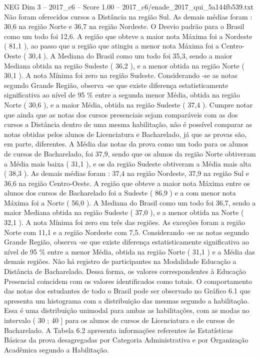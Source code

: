 \begin{textsample}{NEG Dim 3 – 2017\_c6 – Score 1.00 – 2017\_c6/enade\_2017\_qui\_5a144fb539.txt}
Não foram oferecidos cursos a Distância na região Sul.
As demais médias foram : 30,6 na região Norte e 36,7 na região Nordeste.
O Desvio padrão para o Brasil como um todo foi 12,6.
A região que obteve a maior nota Máxima foi a Nordeste ( 81,1 ), ao passo que a região que atingiu a menor nota Máxima foi a Centro-Oeste ( 30,4 ).
A Mediana do Brasil como um todo foi 35,3, sendo a maior Mediana obtida na região Sudeste ( 36,2 ), e a menor obtida na região Norte ( 30,1 ).
A nota Mínima foi zero na região Sudeste.
Considerando -se as notas segundo Grande Região, observa -se que existe diferença estatisticamente significativa ao nível de 95 \% entre a segunda menor Média, obtida na região Norte ( 30,6 ), e a maior Média, obtida na região Sudeste ( 37,4 ).
Cumpre notar que ainda que as notas dos cursos presenciais sejam comparáveis com as dos cursos a Distância dentro de uma mesma habilitação, não é possível comparar as notas obtidas pelos alunos de Licenciatura e Bacharelado, já que as provas são, em parte, diferentes.
A Média das notas da prova como um todo para os alunos de cursos de Bacharelado, foi 37,9, sendo que os alunos da região Norte obtiveram a Média mais baixa ( 31,1 ), e os da região Sudeste obtiveram a Média mais alta ( 38,3 ).
As demais médias foram : 37,4 na região Nordeste, 37,9 na região Sul e 36,6 na região Centro-Oeste.
A região que obteve a maior nota Máxima entre os alunos dos cursos de Bacharelado foi a Sudeste ( 86,9 ) e a com menor nota Máxima foi a Norte ( 56,0 ).
A Mediana do Brasil como um todo foi 36,7, sendo a maior Mediana obtida na região Sudeste ( 37,0 ), e a menor obtida na Norte ( 32,1 ).
A nota Mínima foi zero em três das regiões.
As exceções foram a região Norte com 11,1 e a região Nordeste com 7,5.
Considerando -se as notas segundo Grande Região, observa -se que existe diferença estatisticamente significativa ao nível de 95 \% entre a menor Média, obtida na região Norte ( 31,1 ) e a Média das demais regiões.
Não há registro de participantes na Modalidade Educação a Distância de Bacharelado.
Dessa forma, os valores correspondentes à Educação Presencial coincidem com os valores identificados como totais.
O comportamento das notas dos estudantes de todo o Brasil pode ser observado no Gráfico 6.1 que apresenta um histograma com a distribuição das mesmas segundo a habilitação.
Essa é uma distribuição unimodal para ambas as habilitações, com as modas no intervalo ( 30 ; 40 ] para os alunos de cursos de Licenciatura e de cursos de Bacharelado.
A Tabela 6.2 apresenta informações referentes às Estatísticas Básicas da prova desagregadas por Categoria Administrativa e por Organização Acadêmica segundo a Habilitação.

\end{textsample}
